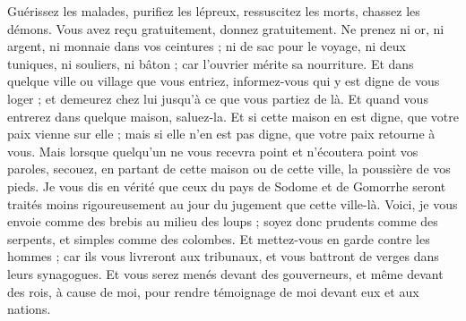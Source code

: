 \begin{multicols}{2}
{Guérissez les malades, purifiez les lépreux, ressuscitez les morts, chassez les démons. Vous avez reçu gratuitement, donnez gratuitement{}.
Ne prenez ni or, ni argent, ni monnaie dans vos ceintures ;
ni de sac pour le voyage, ni deux tuniques, ni souliers, ni bâton ; car l'ouvrier mérite sa nourriture.
Et dans quelque ville ou village que vous entriez, informez-vous qui y est digne de vous loger ; et demeurez chez lui jusqu'à ce que vous partiez de là.
Et quand vous entrerez dans quelque maison, saluez-la.
Et si cette maison en est digne, que votre paix vienne sur elle ; mais si elle n'en est pas digne, que votre paix retourne à vous.
Mais lorsque quelqu'un ne vous recevra point et n'écoutera point vos paroles, secouez, en partant de cette maison ou de cette ville, la poussière de vos pieds.
Je vous dis en vérité que ceux du pays de Sodome et de Gomorrhe seront traités moins rigoureusement au jour du jugement que cette ville-là.
Voici, je vous envoie comme des brebis au milieu des loups ; soyez donc prudents comme des serpents, et simples comme des colombes.
Et mettez-vous en garde contre les hommes ; car ils vous livreront aux tribunaux, et vous battront de verges dans leurs synagogues.
Et vous serez menés devant des gouverneurs, et même devant des rois, à cause de moi, pour rendre témoignage de moi devant eux et aux nations.
}
\end{multicols}
